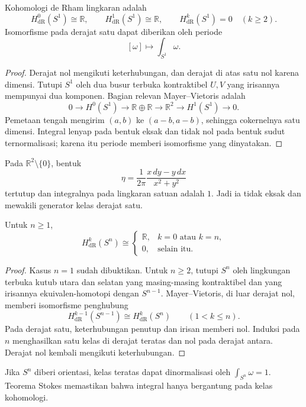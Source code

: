 \begin{Proposition}\label{o011-br-prop-circle}
Kohomologi de Rham lingkaran adalah
\[
 H^0_{\mathrm{dR}}(S^1)\cong\mathbb R,
 \qquad H^1_{\mathrm{dR}}(S^1)\cong\mathbb R,
 \qquad H^k_{\mathrm{dR}}(S^1)=0\quad(k\ge2).
\]
Isomorfisme pada derajat satu dapat diberikan oleh periode
\[
 [\omega]\longmapsto\int_{S^1}\omega.
\]
\end{Proposition}

\begin{proof}
Derajat nol mengikuti keterhubungan, dan derajat di atas satu nol karena
dimensi. Tutupi $S^1$ oleh dua busur terbuka kontraktibel $U,V$ yang irisannya
mempunyai dua komponen. Bagian relevan Mayer--Vietoris adalah
\[
 0\to H^0(S^1)\to\mathbb R\oplus\mathbb R
 \to\mathbb R^2\to H^1(S^1)\to0.
\]
Pemetaan tengah mengirim $(a,b)$ ke $(a-b,a-b)$, sehingga cokernelnya satu
dimensi. Integral lenyap pada bentuk eksak dan tidak nol pada bentuk sudut
ternormalisasi; karena itu periode memberi isomorfisme yang dinyatakan.
\end{proof}

Pada $\mathbb R^2\setminus\{0\}$, bentuk
\[
 \eta=\frac{1}{2\pi}\frac{x\,dy-y\,dx}{x^2+y^2}
\]
tertutup dan integralnya pada lingkaran satuan adalah $1$. Jadi ia tidak eksak
dan mewakili generator kelas derajat satu.

\begin{Theorem}\label{o011-br-thm-sphere}
Untuk $n\ge1$,
\[
 H^k_{\mathrm{dR}}(S^n)\cong
 \begin{cases}
 \mathbb R,&k=0\text{ atau }k=n,\\
 0,&\text{selain itu}.
 \end{cases}
\]
\end{Theorem}

\begin{proof}
Kasus $n=1$ sudah dibuktikan. Untuk $n\ge2$, tutupi $S^n$ oleh lingkungan
terbuka kutub utara dan selatan yang masing-masing kontraktibel dan yang
irisannya ekuivalen-homotopi dengan $S^{n-1}$. Mayer--Vietoris, di luar
derajat nol, memberi isomorfisme penghubung
\[
 H^{k-1}_{\mathrm{dR}}(S^{n-1})\cong H^k_{\mathrm{dR}}(S^n)
 \qquad(1<k\le n).
\]
Pada derajat satu, keterhubungan penutup dan irisan memberi nol. Induksi pada
$n$ menghasilkan satu kelas di derajat teratas dan nol pada derajat antara.
Derajat nol kembali mengikuti keterhubungan.
\end{proof}

Jika $S^n$ diberi orientasi, kelas teratas dapat dinormalisasi oleh
$\int_{S^n}\omega=1$. Teorema Stokes memastikan bahwa integral hanya
bergantung pada kelas kohomologi.

